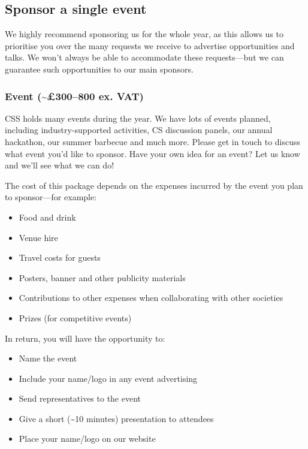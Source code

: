 \documentclass[]{article}
\begin{document}
\subsection*{Sponsor a single event}

We highly recommend sponsoring us for the whole year, as this allows us to prioritise you over the many requests we receive to advertise opportunities and talks. We won't always be able to accommodate these requests---but we can guarantee such opportunities to our main sponsors.

\subsubsection*{Event (\textasciitilde\pounds 300--800 ex. VAT)}

CSS holds many events during the year. We have lots of events planned, including industry-supported activities, CS discussion panels, our annual hackathon, our summer barbecue and much more. Please get in touch to discuss what event you'd like to sponsor. Have your own idea for an event? Let us know and we'll see what we can do!

The cost of this package depends on the expenses incurred by the event you plan to sponsor---for example:

\begin{itemize}
	\item Food and drink
	\item Venue hire
	\item Travel costs for guests
	\item Posters, banner and other publicity materials
	\item Contributions to other expenses when collaborating with other societies
	\item Prizes (for competitive events)
\end{itemize}

In return, you will have the opportunity to:

\begin{itemize}
	\item Name the event
	\item Include your name/logo in any event advertising
	\item Send representatives to the event
	\item Give a short (\textasciitilde 10 minutes) presentation to attendees
	\item Place your name/logo on our website
\end{itemize}
\end{document}
